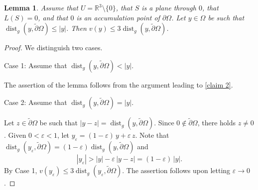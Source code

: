 \documentclass[11pt]{amsart}
\newtheorem{lem}[prop]{Lemma}
\begin{document}
\begin{lem} \label{preemtive}
	Assume that $U=\mathbb{R}^3\setminus\{0\}$, that $S$ is a plane through $0$, that $L(S)=0$, and that $0$ is an accumulation point of $\partial \Omega$.  Let $y\in \Omega$ be such that $\operatorname{dist}_{g}(y,\tilde \partial \Omega)\leq |y|$.  Then $v(y)\leq 3\operatorname{dist}_g(y,\tilde \partial \Omega)$. 
\end{lem} 
\begin{proof}

We distinguish two cases.

Case 1: Assume that $\operatorname{dist}_{g}(y,\tilde \partial \Omega)<|y|$.  

The assertion of  the lemma follows from the  argument leading to \eqref{claim 2}.

Case 2: Assume that $\operatorname{dist}_{g}(y,\tilde \partial \Omega)=|y|$. 

Let $z\in \tilde \partial \Omega$ be such that $|y-z|=\operatorname{dist}_g(y,\tilde \partial \Omega)$. Since $0\notin \tilde \partial \Omega$, there holds $z\neq 0$. Given $0<\varepsilon<1$, let $y_\varepsilon=(1-\varepsilon)\,y+\varepsilon\,z$. Note that $\operatorname{dist}_g(y_\varepsilon,\tilde\partial  \Omega)=(1-\varepsilon)\operatorname{dist}_g(y,\tilde \partial \Omega)$ and $$|y_\varepsilon|>|y|-\varepsilon\,|y-z|=(1-\varepsilon)\,|y|.$$
By Case 1, $v(y_\varepsilon)\leq 3\operatorname{dist}_g(y_\varepsilon,\tilde \partial \Omega)$. The assertion follows upon letting $\varepsilon\to 0$.
\end{proof}
\end{document}
